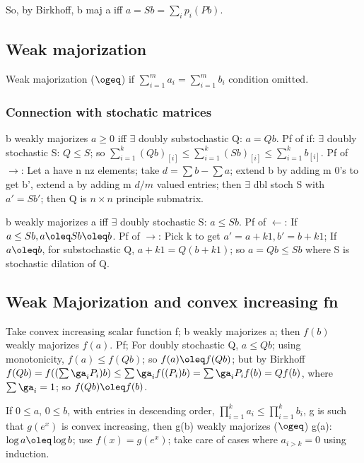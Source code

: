\documentclass[oneside, article]{memoir}
\begin{document}
So, by Birkhoff, b maj a iff $a = Sb = \sum_{i}p_{i}(Pb)$.

\subsection{Weak majorization}
Weak majorization ($\ogeq$) if $\sum_{i=1}^{m} a_{i} = \sum_{i=1}^{m} b_{i}$ condition omitted.

\subsubsection{Connection with stochatic matrices}
b weakly majorizes $a \geq 0$ iff $\exists$ doubly substochastic Q: $a = Qb$. Pf of if: $\exists$ doubly stochastic S: $Q \leq S$; so $\sum_{i=1}^{k}(Qb)_{[i]} \leq \sum_{i=1}^{k}(Sb)_{[i]} \leq \sum_{i=1}^{k}b_{[i]}$. Pf of $\to$: Let a have n nz elements; take $d= \sum b - \sum a$; extend b by adding m 0's to get b', extend a by adding m $d/m$ valued entries; then $\exists$ dbl stoch S with $a' = Sb'$; then Q is $n \times n$ principle submatrix.

b weakly majorizes a iff $\exists$ doubly stochastic S: $a \leq Sb$. Pf of $\gets$: If $a \leq Sb, a \oleq Sb \oleq b$. Pf of $\to$: Pick k to get $a' = a+k1, b' = b + k1$; If $a \oleq b$, for substochastic Q, $a+k1 = Q(b + k1)$; so $a = Qb \leq Sb$ where S is stochastic dilation of Q.

\subsection{Weak Majorization and convex increasing fn}
Take convex increasing scalar function f; b weakly majorizes a; then $f(b)$ weakly majorizes $f(a)$. Pf; For doubly stochastic Q, $a \leq Qb$; using monotonicity, $f(a) \leq f(Qb)$; so $f(a) \oleq f(Qb)$; but by Birkhoff $f(Qb) = f((\sum \ga_{i}P_{i})b) \leq \sum \ga_{i}f((P_{i})b) = \sum \ga_{i}P_{i}f(b) = Qf(b)$, where $\sum \ga_{i} = 1$; so $f(Qb) \oleq f(b)$.

If $0 \leq a$, $0 \leq b$, with entries in descending order, $\prod_{i=1}^{k}a_{i} \leq \prod_{i=1}^{k} b_{i}$, g is such that $g(e^{x})$ is convex increasing, then g(b) weakly majorizes ($\ogeq$) g(a): $\log a \oleq \log b$; use $f(x) = g(e^{x})$; take care of cases where $a_{i > k} = 0$ using induction.



\end{document}
